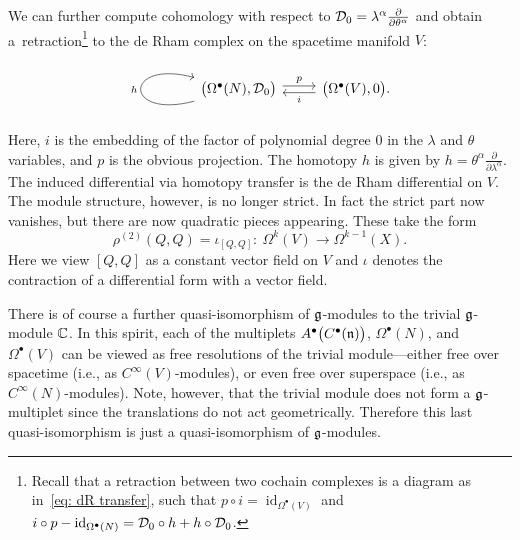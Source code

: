 \documentclass[pdftex]{sigma}
\numberwithin{equation}{section}
\DeclareMathOperator{\id}{id}
\begin{document}
\begin{rmk}
	We can further compute cohomology with respect to $\mathcal D_0 = \lambda^\alpha \frac{\partial}{\partial \theta^\alpha}$ and obtain a~retraction\footnote{Recall that a retraction between two cochain complexes is a diagram as in~\eqref{eq: dR transfer}, such that $p \circ i = \id_{\Omega^\bullet(V)}$ and $i \circ p - \id_{\Omega^\bullet(N)} = \cD_0 \circ h + h \circ \cD_0$.} to the de Rham complex on the spacetime manifold $V$:
	\begin{equation} \label{eq: dR transfer}
	\begin{tikzcd}
	\arrow[loop left]{l}{h}\big(\Omega^\bullet(N) , \cD_0\big)\arrow[r, shift left, "p"] & \big(\Omega^\bullet(V) , 0\big).\arrow[l, shift left, "i"]
	\end{tikzcd}
	\end{equation}
	Here, $i$ is the embedding of the factor of polynomial degree 0 in the $\lambda$ and $\theta$ variables, and $p$ is the obvious projection. The homotopy $h$ is given by $h=\theta^\alpha \frac{\partial}{\partial \lambda^\alpha}$.
	The induced differential via homotopy transfer is the de Rham differential on $V$. The module structure, however, is no longer strict. In fact the strict part now vanishes, but there are now quadratic pieces appearing. These take the form
	\begin{equation*}
	\rho^{(2)} (Q , Q) = \iota_{[Q, Q ]} \colon \ \Omega^k(V) \longrightarrow \Omega^{k-1}(X) .
	\end{equation*}
	Here we view $[Q, Q]$ as a constant vector field on $V$ and $\iota$ denotes the contraction of a differential form with a vector field.
	
	
	There is of course a further quasi-isomorphism of $\mathfrak g$-modules to the trivial $\mathfrak g$-module $\mathbb C$. In this spirit, each of the multiplets $A^\bullet\big(C^\bullet(\mathfrak n)\big)$, $\Omega^\bullet(N)$, and $\Omega^\bullet(V)$ can be viewed as free resolutions of the trivial module---either free over spacetime (i.e., as $C^\infty(V)$-modules), or even free over superspace (i.e., as $C^\infty(N)$-modules). Note, however, that the trivial module does not form a $\mathfrak g$-multiplet since the translations do not act geometrically. Therefore this last quasi-isomorphism is just a quasi-isomorphism of $\mathfrak g$-modules.
\end{rmk}
\end{document}
